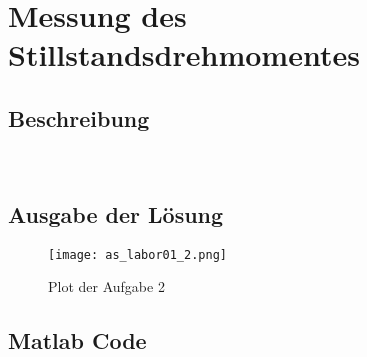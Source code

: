\section{Messung des Stillstandsdrehmomentes}

\subsection{Beschreibung}
\lipsum[1]\\

\subsection{Ausgabe der Lösung}
\begin{figure}[htp]
 \centering
 \texttt{[image: as\_labor01\_2.png]}
 \caption{Plot der Aufgabe 2}
 \label{fig:PlotAufgabe2}
\end{figure}

\subsection{Matlab Code}

